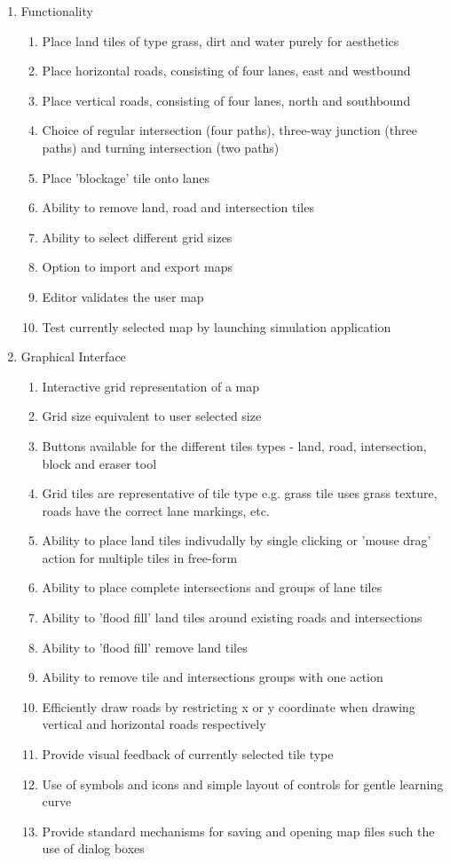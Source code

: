 \begin{enumerate}\itemsep1pt \parskip0pt 
  \item Functionality
  \begin{enumerate}[label*=\arabic*.]
    \item Place land tiles of type grass, dirt and water purely for aesthetics
    \item Place horizontal roads, consisting of four lanes, east and westbound
    \item Place vertical roads, consisting of four lanes, north and southbound
    \item Choice of regular intersection (four paths), three-way junction (three paths) and turning intersection (two paths) 
    \item Place 'blockage' tile onto lanes
    \item Ability to remove land, road and intersection tiles
    \item Ability to select different grid sizes
    \item Option to import and export maps
	\item Editor validates the user map
	\item Test currently selected map by launching simulation application
  \end{enumerate}
    \item Graphical Interface
  \begin{enumerate}[label*=\arabic*.]
	\item Interactive grid representation of a map
	\item Grid size equivalent to user selected size
	\item Buttons available for the different tiles types - land, road, intersection, block and eraser tool
		\item Grid tiles are representative of tile type e.g. grass tile uses grass texture, roads have the correct lane markings, etc.
	\item Ability to place land tiles indivudally by single clicking or 'mouse drag' action for multiple tiles in free-form
	\item Ability to place complete intersections and groups of lane tiles
	\item Ability to 'flood fill' land tiles around existing roads and intersections
	\item Ability to 'flood fill' remove land tiles
	\item Ability to remove tile and intersections groups with one action
	\item Efficiently draw roads by restricting x or y coordinate when drawing vertical and horizontal roads respectively
	\item Provide visual feedback of currently selected tile type
	\item Use of symbols and icons and simple layout of controls for gentle learning curve
	\item Provide standard mechanisms for saving and opening map files such the use of dialog boxes
  \end{enumerate}
\end{enumerate}

